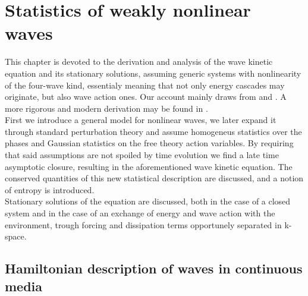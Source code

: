 \newpage
\phantom{}
\section{Statistics of weakly nonlinear waves}

This chapter is devoted to the derivation and analysis of the wave kinetic equation and its stationary solutions, assuming generic systems with nonlinearity of 
the four-wave kind, essentialy meaning that not only energy cascades may originate, but also wave action ones. Our account mainly draws from \cite{Onorato2020} and 
\cite{Zakharov}. A more rigorous and modern derivation may be found in \cite{Nazarenko2011}. \\
First we introduce a general model for nonlinear waves, we later expand it through standard perturbation theory and assume homogeneus statistics over the phases 
and Gaussian statistics on the free theory action variables. By requiring that said assumptions are not spoiled by time evolution we find a late time asymptotic closure, 
resulting in the aforementioned wave kinetic equation. The conserved quantities of this new statistical description are discussed, and a notion of entropy is introduced. \\
Stationary solutions of the equation are discussed, both in the case of a closed system and  in the case of an exchange of energy 
and wave action with the environment, trough forcing and dissipation terms opportunely separated in k-space.\\ 

\subsection{Hamiltonian description of waves in continuous media}

